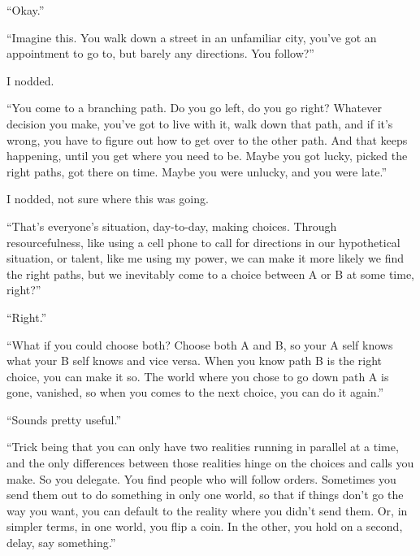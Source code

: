 ``Okay.''



``Imagine this.  You walk down a street in an unfamiliar city, you've got an appointment to go to, but barely any directions.  You follow?''



I nodded.



``You come to a branching path.  Do you go left, do you go right?  Whatever decision you make, you've got to live with it, walk down that path, and if it's wrong, you have to figure out how to get over to the other path.  And that keeps happening, until you get where you need to be.  Maybe you got lucky, picked the right paths, got there on time.  Maybe you were unlucky, and you were late.''



I nodded, not sure where this was going.



``That's everyone's situation, day-to-day, making choices.  Through resourcefulness, like using a cell phone to call for directions in our hypothetical situation, or talent, like me using my power, we can make it more likely we find the right paths, but we inevitably come to a choice between A or B at some time, right?''



``Right.''



``What if you could choose both?  Choose both A and B, so your A self knows what your B self knows and vice versa.  When you know path B is the right choice, you can make it so.  The world where you chose to go down path A is gone, vanished, so when you comes to the next choice, you can do it again.''



``Sounds pretty useful.''



``Trick being that you can only have two realities running in parallel at a time, and the only differences between those realities hinge on the choices and calls you make.  So you delegate.  You find people who will follow orders.  Sometimes you send them out to do something in only one world, so that if things don't go the way you want, you can default to the reality where you didn't send them.  Or, in simpler terms, in one world, you flip a coin.  In the other, you hold on a second, delay, say something.''



